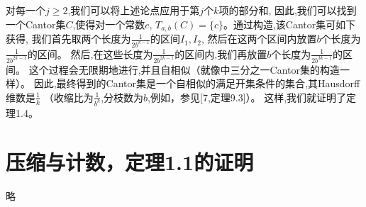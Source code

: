 \documentclass[12pt,a4paper]{article}
\begin{document}
       对每一个$j\ge2$,我们可以将上述论点应用于第$j$个$k$项的部分和,
       因此,我们可以找到一个Cantor集$C$,使得对一个常数$c$,
       $T_{a,b}(C)=\{c\}$。通过构造,该Cantor集可如下获得,
       我们首先取两个长度为$\frac{1}{2b^{k-1}}$的区间$I_1,I_2$,
       然后在这两个区间内放置$b$个长度为$\frac{1}{2b^{2k-1}}$的区间。
       然后,在这些长度为$\frac{1}{2b^{2k-1}}$的区间内,我们再放置$b$个长度为$\frac{1}{2b^{3k-1}}$的区间。
       这个过程会无限期地进行,并且自相似（就像中三分之一Cantor集的构造一样）。
       因此,最终得到的Cantor集是一个自相似的满足开集条件的集合,其Hausdorff维数是$\frac{1}{k}$
       （收缩比为$\frac{1}{b^k}$,分枝数为$b$,例如，参见[7,定理9.3]）。
       这样,我们就证明了定理1.4。
       \section{压缩与计数，定理1.1的证明}
       略

       
\end{document}
